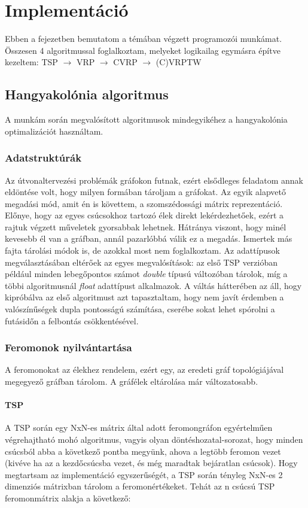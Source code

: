 \chapter{Implementáció} \label{implementationChapter}

Ebben a fejezetben bemutatom a témában végzett programozói munkámat. Összesen 4 algoritmussal foglalkoztam, melyeket logikailag egymásra építve kezeltem:
TSP  \(\rightarrow\) VRP \(\rightarrow\) CVRP \(\rightarrow\) (C)VRPTW

\section{Hangyakolónia algoritmus}
A munkám során megvalósított algoritmusok mindegyikéhez a hangyakolónia optimalizációt használtam.

\subsection{Adatstruktúrák}
Az útvonaltervezési problémák gráfokon futnak, ezért elsődleges feladatom annak eldöntése volt, hogy milyen formában tároljam a gráfokat. Az egyik alapvető megadási mód, amit én is követtem, a szomszédossági mátrix reprezentáció. Előnye, hogy az egyes csúcsokhoz tartozó élek direkt lekérdezhetőek, ezért a rajtuk végzett műveletek gyorsabbak lehetnek. Hátránya viszont, hogy minél kevesebb él van a gráfban, annál pazarlóbbá válik ez a megadás. Ismertek más fajta tárolási módok is, de azokkal most nem foglalkoztam. \cite{alg_optim}
Az adattípusok megválasztásában eltérőek az egyes megvalósítások: az első TSP verzióban például minden lebegőpontos számot \textit{double} típusú változóban tárolok, míg a többi algoritmusnál \textit{float} adattípust alkalmazok. A váltás hátterében az áll, hogy kipróbálva az első algoritmust azt tapasztaltam, hogy nem javít érdemben a valószínűségek dupla pontosságú számítása, cserébe sokat lehet spórolni a futásidőn a felbontás csökkentésével.


\subsection{Feromonok nyilvántartása}
A feromonokat az élekhez rendelem, ezért egy, az eredeti gráf topológiájával megegyező gráfban tárolom. A gráfélek eltárolása már változatosabb.

\subsubsection{TSP}
A TSP során egy NxN-es mátrix által adott feromongráfon egyértelműen végrehajtható mohó algoritmus, vagyis olyan döntéshozatal-sorozat, hogy minden csúcsból abba a következő pontba megyünk, ahova a legtöbb feromon vezet (kivéve ha az a kezdőcsúcsba vezet, és még maradtak bejáratlan csúcsok). Hogy megtartsam az implementáció egyszerűségét, a TSP során tényleg NxN-es 2 dimenziós mátrixban tárolom a feromonértékeket. Tehát az n csúcsú TSP feromonmátrix alakja a következő:

